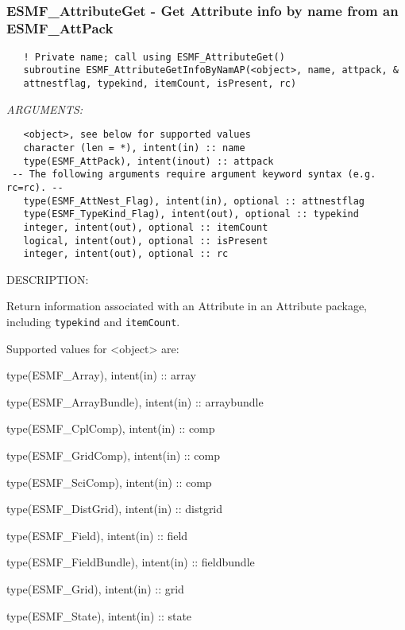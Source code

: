  
\mbox{}\hrulefill\ 
 
\subsubsection [ESMF\_AttributeGet] {ESMF\_AttributeGet - Get Attribute info by name from an ESMF\_AttPack}


  
\begin{verbatim}   ! Private name; call using ESMF_AttributeGet()
   subroutine ESMF_AttributeGetInfoByNamAP(<object>, name, attpack, &
   attnestflag, typekind, itemCount, isPresent, rc)\end{verbatim}{\em ARGUMENTS:}
\begin{verbatim}   <object>, see below for supported values
   character (len = *), intent(in) :: name
   type(ESMF_AttPack), intent(inout) :: attpack
 -- The following arguments require argument keyword syntax (e.g. rc=rc). --
   type(ESMF_AttNest_Flag), intent(in), optional :: attnestflag
   type(ESMF_TypeKind_Flag), intent(out), optional :: typekind
   integer, intent(out), optional :: itemCount
   logical, intent(out), optional :: isPresent
   integer, intent(out), optional :: rc\end{verbatim}
{\sf DESCRIPTION:\\ }


   Return information associated with an Attribute in an Attribute package,
   including {\tt typekind} and {\tt itemCount}.
  
   Supported values for <object> are:
   \begin{description}
   \item type(ESMF\_Array), intent(in) :: array
   \item type(ESMF\_ArrayBundle), intent(in) :: arraybundle
   \item type(ESMF\_CplComp), intent(in) :: comp
   \item type(ESMF\_GridComp), intent(in) :: comp
   \item type(ESMF\_SciComp), intent(in) :: comp
   \item type(ESMF\_DistGrid), intent(in) :: distgrid
   \item type(ESMF\_Field), intent(in) :: field
   \item type(ESMF\_FieldBundle), intent(in) :: fieldbundle
   \item type(ESMF\_Grid), intent(in) :: grid
   \item type(ESMF\_State), intent(in) :: state
   \end{description}
  

